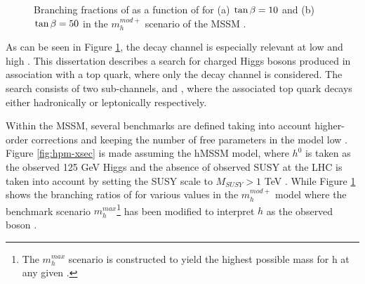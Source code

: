 	\begin{figure}[!ht]
		\centering
		\caption{\label{fig:hpm-br} Branching fractions of \Hpm as a function of \mHpm for (a) $\tan\beta = 10$ and (b) $\tan\beta = 50$ in the $m^{mod+}_{h}$ scenario of the \gls{MSSM} \cite{Higgs-Crosssections}. }
	\end{figure}
	As can be seen in Figure \ref{fig:hpm-br}, the \HpmLong decay channel is especially relevant at low \mHpm and high \tanb. This dissertation describes a search for charged Higgs bosons produced in association with a top quark, where only the \HpmLong decay channel is considered. The search consists of two sub-channels, \taujets and \taulep, where the associated top quark decays either hadronically or leptonically respectively. 

	Within the \gls{MSSM}, several benchmarks are defined taking into account higher-order corrections and keeping the number of free parameters in the model low \cite{MSSM-benchmarks}. Figure \ref{fig:hpm-xsec} is made assuming the hMSSM model, where $h^0$ is taken as the observed 125 GeV Higgs and the absence of observed \gls{SUSY} at the LHC is taken into account by setting the \gls{SUSY} scale to $M_{SUSY}>1$ TeV \cite{hMSSM}. While Figure \ref{fig:hpm-br} shows the branching ratios of \Hpm for various \tanb values in the $m^{mod+}_{h}$ model where the benchmark scenario $m^{max}_{h}$\footnote{The $m^{max}_{h}$ scenario is constructed to yield the highest possible mass for h at any given \tanb.} has been modified to interpret $h$ as the observed boson \cite{MSSM-benchmarks}.

